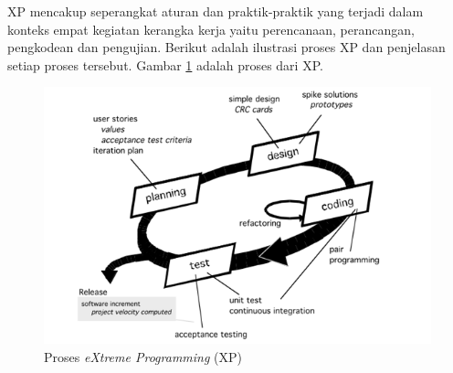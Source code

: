 XP mencakup seperangkat aturan dan praktik-praktik yang terjadi dalam konteks empat kegiatan kerangka kerja yaitu perencanaan, perancangan, pengkodean dan pengujian. Berikut adalah ilustrasi proses XP dan penjelasan setiap proses tersebut. Gambar \ref{xp} adalah proses dari XP.

\begin{figure}[H]
	\centering
	\includegraphics[width=\linewidth]{gambar/xp}
	\caption{Proses \textit{eXtreme Programming} (XP) }
	\label{xp}
\end{figure}

